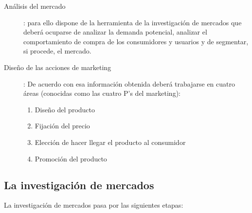 \documentclass[10pt,a4paper,spanish]{report}
\begin{document}
		\begin{description}
			\item[Análisis del mercado]: para ello dispone de la herramienta de la investigación de mercados que deberá ocuparse de analizar la demanda potencial, analizar el comportamiento de compra de los consumidores y usuarios y de segmentar, si procede, el mercado.

			\item[Diseño de las acciones de marketing]: De acuerdo con esa información obtenida deberá trabajarse en cuatro áreas (conocidas como las cuatro P's del marketing):
			\begin{enumerate}
				\item Diseño del producto
				\item Fijación del precio
				\item Elección de hacer llegar el producto al consumidor
				\item Promoción del producto
			\end{enumerate}
		\end{description}

		\subsection{\textcolor[rgb]{0.1,0.2,0.4}La investigación de mercados}

			La investigación de mercados pasa por las siguientes etapas:
\end{document}
